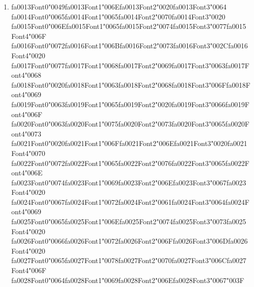 \documentclass[11pt]{article}
\begin{document}
\begin{enumerate}[label=Q\arabic*., leftmargin=*]
\item {\csname fa0013Font0\endcsname\char"0049}{\csname fa0013Font1\endcsname\char"006E}{\csname fa0013Font2\endcsname\char"0020}{\csname fa0013Font3\endcsname\char"0064} {\csname fa0014Font0\endcsname\char"0065}{\csname fa0014Font1\endcsname\char"0065}{\csname fa0014Font2\endcsname\char"0070}{\csname fa0014Font3\endcsname\char"0020} {\csname fa0015Font0\endcsname\char"006E}{\csname fa0015Font1\endcsname\char"0065}{\csname fa0015Font2\endcsname\char"0074}{\csname fa0015Font3\endcsname\char"0077}{\csname fa0015Font4\endcsname\char"006F} {\csname fa0016Font0\endcsname\char"0072}{\csname fa0016Font1\endcsname\char"006B}{\csname fa0016Font2\endcsname\char"0073}{\csname fa0016Font3\endcsname\char"002C}{\csname fa0016Font4\endcsname\char"0020} {\csname fa0017Font0\endcsname\char"0077}{\csname fa0017Font1\endcsname\char"0068}{\csname fa0017Font2\endcsname\char"0069}{\csname fa0017Font3\endcsname\char"0063}{\csname fa0017Font4\endcsname\char"0068} {\csname fa0018Font0\endcsname\char"0020}{\csname fa0018Font1\endcsname\char"0063}{\csname fa0018Font2\endcsname\char"0068}{\csname fa0018Font3\endcsname\char"006F}{\csname fa0018Font4\endcsname\char"0069} {\csname fa0019Font0\endcsname\char"0063}{\csname fa0019Font1\endcsname\char"0065}{\csname fa0019Font2\endcsname\char"0020}{\csname fa0019Font3\endcsname\char"0066}{\csname fa0019Font4\endcsname\char"006F} {\csname fa0020Font0\endcsname\char"0063}{\csname fa0020Font1\endcsname\char"0075}{\csname fa0020Font2\endcsname\char"0073}{\csname fa0020Font3\endcsname\char"0065}{\csname fa0020Font4\endcsname\char"0073} {\csname fa0021Font0\endcsname\char"0020}{\csname fa0021Font1\endcsname\char"006F}{\csname fa0021Font2\endcsname\char"006E}{\csname fa0021Font3\endcsname\char"0020}{\csname fa0021Font4\endcsname\char"0070} {\csname fa0022Font0\endcsname\char"0072}{\csname fa0022Font1\endcsname\char"0065}{\csname fa0022Font2\endcsname\char"0076}{\csname fa0022Font3\endcsname\char"0065}{\csname fa0022Font4\endcsname\char"006E} {\csname fa0023Font0\endcsname\char"0074}{\csname fa0023Font1\endcsname\char"0069}{\csname fa0023Font2\endcsname\char"006E}{\csname fa0023Font3\endcsname\char"0067}{\csname fa0023Font4\endcsname\char"0020} {\csname fa0024Font0\endcsname\char"0067}{\csname fa0024Font1\endcsname\char"0072}{\csname fa0024Font2\endcsname\char"0061}{\csname fa0024Font3\endcsname\char"0064}{\csname fa0024Font4\endcsname\char"0069} {\csname fa0025Font0\endcsname\char"0065}{\csname fa0025Font1\endcsname\char"006E}{\csname fa0025Font2\endcsname\char"0074}{\csname fa0025Font3\endcsname\char"0073}{\csname fa0025Font4\endcsname\char"0020} {\csname fa0026Font0\endcsname\char"0066}{\csname fa0026Font1\endcsname\char"0072}{\csname fa0026Font2\endcsname\char"006F}{\csname fa0026Font3\endcsname\char"006D}{\csname fa0026Font4\endcsname\char"0020} {\csname fa0027Font0\endcsname\char"0065}{\csname fa0027Font1\endcsname\char"0078}{\csname fa0027Font2\endcsname\char"0070}{\csname fa0027Font3\endcsname\char"006C}{\csname fa0027Font4\endcsname\char"006F} {\csname fa0028Font0\endcsname\char"0064}{\csname fa0028Font1\endcsname\char"0069}{\csname fa0028Font2\endcsname\char"006E}{\csname fa0028Font3\endcsname\char"0067}{\char"003F}\\

\end{enumerate}
\end{document}
